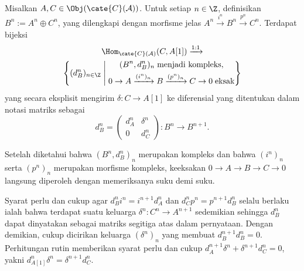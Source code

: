 \begin{lema}\label{prop:split-differential}
	Misalkan $A, C \in \Obj(\cate{C}(\mathcal{A}))$. Untuk setiap $n \in \Z$, definisikan $B^n := A^n \oplus C^n$, yang dilengkapi dengan morfisme jelas $A^n \xrightarrow{i^n} B^n \xrightarrow{p^n} C^n$. Terdapat bijeksi
	\[ \begin{gathered}
		\Hom_{\cate{C}(\mathcal{A})}(C, A[1]) \xrightarrow{1:1} \\
		\left\{(d_B^n)_{n \in \Z}\;\middle|\;
		\begin{gathered}
			(B^n, d_B^n)_n \;\text{menjadi kompleks}, \\
			0 \to A \xrightarrow{(i^n)_n} B \xrightarrow{(p^n)_n} C \to 0 \;\text{eksak}
		\end{gathered}\right\}
	\end{gathered} \]
	yang secara eksplisit mengirim $\delta: C \to A[1]$ ke diferensial yang ditentukan dalam notasi matriks sebagai
	\[ d_B^n = \begin{pmatrix}
		d_A^n & \delta^n \\
		0 & d_C^n
	\end{pmatrix}: B^n \to B^{n+1}. \]
\end{lema}
\begin{bukti}
	Setelah diketahui bahwa $(B^n, d_B^n)_n$ merupakan kompleks dan bahwa $(i^n)_n$ serta $(p^n)_n$ merupakan morfisme kompleks, keeksakan $0 \to A \to B \to C \to 0$ langsung diperoleh dengan memeriksanya suku demi suku.
	
	Syarat perlu dan cukup agar $d_B^n i^n = i^{n+1} d_A^n$ dan $d_C^n p^n = p^{n+1} d_B^n$ selalu berlaku ialah bahwa terdapat suatu keluarga $\delta^n: C^n \to A^{n+1}$ sedemikian sehingga $d_B^n$ dapat dinyatakan sebagai matriks segitiga atas dalam pernyataan. Dengan demikian, cukup dicirikan keluarga $(\delta^n)_n$ yang membuat $d_B^{n+1} d_B^n = 0$. Perhitungan rutin memberikan syarat perlu dan cukup $d_A^{n+1} \delta^n + \delta^{n+1} d_C^n = 0$, yakni $d_{A[1]}^n \delta^n = \delta^{n+1} d_C^n$.
\end{bukti}

